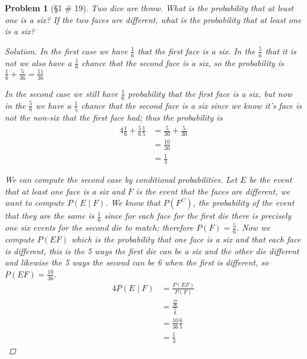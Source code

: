 \documentclass[11pt, oneside]{book}   	%
\newtheorem{problem}{Problem}
\begin{document}
\begin{problem}[\S 1 \# 19]
	Two dice are throw. What is the probability that at least one is a six? If the two faces are different, what is the probability that at least one is a six? 
	\begin{proof}[Solution]
		In the first case we have $\frac{1}{6}$ that the first face is a six. In the $\frac{5}{6}$ that it is not we also have a $\frac{1}{6}$ chance that the second face is a six, so the probability is $\frac{1}{6}+\frac{5}{36}=\frac{11}{36}$ 
		
		In the second case we still have $\frac{1}{6}$ probability that the first face is a six, but now in the $\frac{5}{6}$ we have a $\frac{1}{5}$ chance that the second face is a six since we know it's face is not the non-six that the first face had; thus the probability is
		\begin{alignat*}{4}
			\frac{1}{6}+\frac{5}{6}\frac{1}{5}&= \frac{5}{30}+\frac{5}{30} \\
				&=\frac{10}{30} \\
				&=\frac{1}{3}
		\end{alignat*}
		
		We can compute the second case by conditional probabilities. Let $E$ be the event that at least one face is a six and $F$ is the event that the faces are different, we want to compute $P(E\mid F)$. We know that $P\left(F^C\right)$, the probability of the event that they are the same is $\frac{1}{6}$ since for each face for the first die there is precisely one six events for the second die to match; therefore $P(F)=\frac{5}{6}$. Now we compute $P(EF)$ which is the probability that one face is a six and that each face is different, this is the 5 ways the first die can be a six and the other die different and likewise the 5 ways the second can be 6 when the first is different, so $P(EF)=\frac{10}{36}$.
		\begin{alignat*}{4}
			P(E\mid F)&=\frac{P(EF)}{P(F)} \\
				&=\frac{\frac{10}{36}}{\frac{5}{6}} \\
				&=\frac{10}{36}\frac{6}{5} \\
				&=\frac{1}{3}
		\end{alignat*} 
	\end{proof}
\end{problem}
\end{document}
